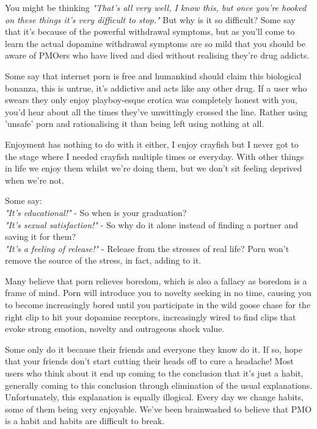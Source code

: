 \documentclass[easypeasy.tex]{subfiles}
\begin{document}
You might be thinking \textit{"That's all very well, I know this, but once you're hooked on these things it's very difficult to stop."} But why is it so difficult? Some say that it's because of the powerful withdrawal symptoms, but as you'll come to learn the actual dopamine withdrawal symptoms are so mild that you should be aware of PMOers who have lived and died without realising they're drug addicts.

Some say that internet porn is free and humankind should claim this biological bonanza, this is untrue, it's addictive and acts like any other drug. If a user who swears they only enjoy playboy-esque erotica was completely honest with you, you'd hear about all the times they've unwittingly crossed the line. Rather using 'unsafe' porn and rationalising it than being left using nothing at all.

Enjoyment has nothing to do with it either, I enjoy crayfish but I never got to the stage where I needed crayfish multiple times or everyday. With other things in life we enjoy them whilst we're doing them, but we don't sit feeling deprived when we're not.

Some say:\\
  \textit{"It's educational!"} - So when is your graduation?\\
  \textit{"It's sexual satisfaction!"} - So why do it alone instead of finding a partner and saving it for them?\\
  \textit{"It's a feeling of release!"} - Release from the stresses of real life? Porn won't remove the source of the stress, in fact, adding to it.

Many believe that porn relieves boredom, which is also a fallacy as boredom is a frame of mind. Porn will introduce you to novelty seeking in no time, causing you to become increasingly bored until you participate in the wild goose chase for the right clip to hit your dopamine receptors, increasingly wired to find clips that evoke strong emotion, novelty and outrageous shock value.

Some only do it because their friends and everyone they know do it. If so, hope that your friends don't start cutting their heads off to cure a headache! Most users who think about it end up coming to the conclusion that it's just a habit, generally coming to this conclusion through elimination of the usual explanations. Unfortunately, this explanation is equally illogical. Every day we change habits, some of them being very enjoyable. We've been brainwashed to believe that PMO is a habit and habits are difficult to break.
\end{document}
